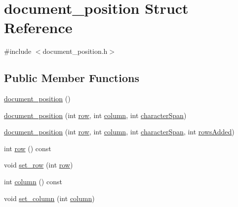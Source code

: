 \hypertarget{structdocument__position}{}\section{document\+\_\+position Struct Reference}
\label{structdocument__position}


{\ttfamily \#include $<$document\+\_\+position.\+h$>$}

\subsection*{Public Member Functions}
\begin{DoxyCompactItemize}
\item 
\mbox{\hyperlink{structdocument__position_ae82af8b236dbaf8f4d9d3ca4f346cf14}{document\+\_\+position}} ()
\item 
\mbox{\hyperlink{structdocument__position_a35caaae8bd7652358dc56a09503d252e}{document\+\_\+position}} (int \mbox{\hyperlink{structdocument__position_a9106ef48e53f1a65574995fb5c122a6b}{row}}, int \mbox{\hyperlink{structdocument__position_a936bc236ff43a4568f793ce3c06cae5e}{column}}, int \mbox{\hyperlink{structdocument__position_a422c8ccb286da776adfe23ac30a65cc4}{character\+Span}})
\item 
\mbox{\hyperlink{structdocument__position_ab98c2202eb00d822d30e9b9a9f59989b}{document\+\_\+position}} (int \mbox{\hyperlink{structdocument__position_a9106ef48e53f1a65574995fb5c122a6b}{row}}, int \mbox{\hyperlink{structdocument__position_a936bc236ff43a4568f793ce3c06cae5e}{column}}, int \mbox{\hyperlink{structdocument__position_a422c8ccb286da776adfe23ac30a65cc4}{character\+Span}}, int \mbox{\hyperlink{structdocument__position_ae2d90039ea04e702006f0fa2748b3959}{rows\+Added}})
\item 
int \mbox{\hyperlink{structdocument__position_a1876acea232279350a461f674d908175}{row}} () const
\item 
void \mbox{\hyperlink{structdocument__position_ae3bfd7a4d0e554a3694f74e347d67693}{set\+\_\+row}} (int \mbox{\hyperlink{structdocument__position_a9106ef48e53f1a65574995fb5c122a6b}{row}})
\item 
int \mbox{\hyperlink{structdocument__position_ab143473cb92434db072557f3dd77e5f9}{column}} () const
\item 
void \mbox{\hyperlink{structdocument__position_af6a2a0da00a3a6b6fbb4b6b06a77fca0}{set\+\_\+column}} (int \mbox{\hyperlink{structdocument__position_a936bc236ff43a4568f793ce3c06cae5e}{column}})

\end{DoxyCompactItemize}
